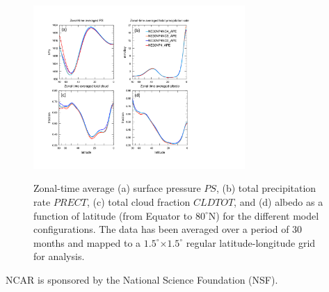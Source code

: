 \documentclass[twocol]{ametsoc}
\begin{document}
\begin{figure}[t]
\noindent\includegraphics[width=19pc,angle=0]{figs/zonal_time_avg_2d_fields.pdf}\\
\caption{Zonal-time average (a) surface pressure $PS$, (b) total precipitation rate $PRECT$, (c) total cloud fraction $CLDTOT$, and (d) albedo as a function of latitude (from Equator to $80^\circ$N) for the different model configurations. The data has been averaged over a period of 30 months and mapped to a $1.5^\circ$$\times$$1.5^\circ$ regular latitude-longitude grid for analysis.}
\end{figure}




%
\acknowledgments
NCAR is sponsored by the National Science Foundation (NSF).
\end{document}
